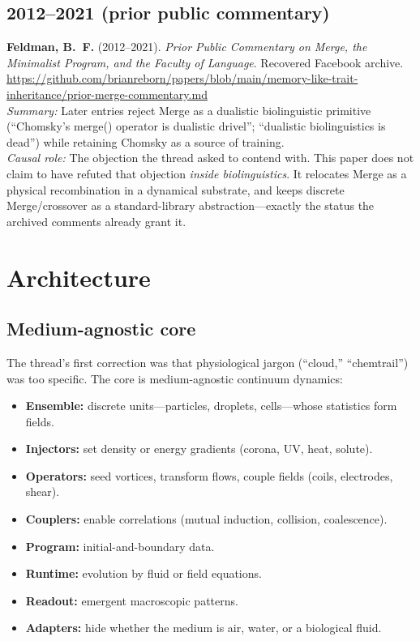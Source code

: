 \documentclass[11pt,a4paper]{article}
\begin{document}
\subsection*{2012--2021 (prior public commentary)}
\textbf{Feldman, B.~F.} (2012--2021). \textit{Prior Public Commentary on Merge, the Minimalist Program, and the Faculty of Language}. Recovered Facebook archive.  \\
\url{https://github.com/brianreborn/papers/blob/main/memory-like-trait-inheritance/prior-merge-commentary.md}\\
\textit{Summary:} Later entries reject Merge as a dualistic biolinguistic primitive (``Chomsky's merge() operator is dualistic drivel''; ``dualistic biolinguistics is dead'') while retaining Chomsky as a source of training.\\
\textit{Causal role:} The objection the thread asked to contend with. This paper does not claim to have refuted that objection \emph{inside biolinguistics}. It relocates Merge as a physical recombination in a dynamical substrate, and keeps discrete Merge/crossover as a standard-library abstraction---exactly the status the archived comments already grant it.

\section{Architecture}
\subsection{Medium-agnostic core}
The thread's first correction was that physiological jargon (``cloud,'' ``chemtrail'') was too specific. The core is medium-agnostic continuum dynamics:

\begin{itemize}[leftmargin=1.4em]
\item \textbf{Ensemble:} discrete units---particles, droplets, cells---whose statistics form fields.
\item \textbf{Injectors:} set density or energy gradients (corona, UV, heat, solute).
\item \textbf{Operators:} seed vortices, transform flows, couple fields (coils, electrodes, shear).
\item \textbf{Couplers:} enable correlations (mutual induction, collision, coalescence).
\item \textbf{Program:} initial-and-boundary data.
\item \textbf{Runtime:} evolution by fluid or field equations.
\item \textbf{Readout:} emergent macroscopic patterns.
\item \textbf{Adapters:} hide whether the medium is air, water, or a biological fluid.
\end{itemize}
\end{document}
